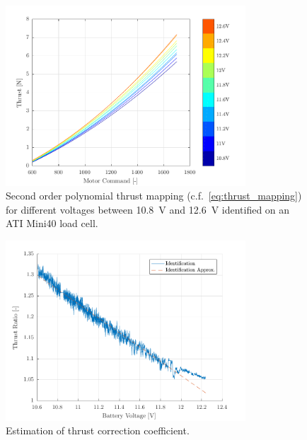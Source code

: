\documentclass[10pt,a4paper,fleqn]{article}
\begin{document}
\begin{figure}[]
   \centering
   \includegraphics[width=0.8\textwidth]{img/voltage_dep_thrust_mapping.pdf}
   \caption{Second order polynomial thrust mapping (c.f.~\eqref{eq:thrust_mapping}) for different voltages between \SI{10.8}{\volt} and \SI{12.6}{\volt} identified on an ATI Mini40 load cell.}
   \label{fig:volt_dep_thrust_mapping}
\end{figure}

\begin{figure}[]
   \centering
   \includegraphics[width=0.8\textwidth]{img/vbat_dep_function_id.pdf}
   \caption{Estimation of thrust correction coefficient.}
   \label{fig:thrust_corr_coeff_est}
\end{figure}
\end{document}
